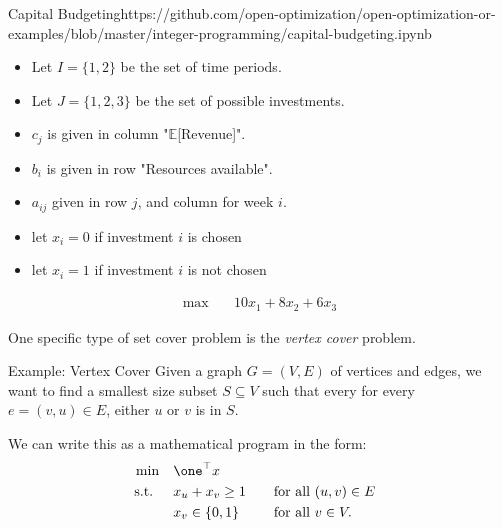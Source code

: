 %
\begin{examplewithcode}{Capital Budgeting}{https://github.com/open-optimization/open-optimization-or-examples/blob/master/integer-programming/capital-budgeting.ipynb}
\begin{itemize}
\item Let $I = \{1,2\}$ be the set of time periods.
\item Let $J = \{1, 2,3\}$ be the set of possible investments.
\end{itemize}
%
\begin{itemize}
\item $c_j$ is given in column "$\mathbb{E}$[Revenue]".
\item $b_i$ is given in row "Resources available".
\item $a_{ij}$ given in row $j$, and column for week $i$.
\end{itemize}
%
\begin{itemize}
\item let $x_i = 0$ if investment $i$ is chosen
\item let $x_i = 1$ if investment $i$ is not chosen
\end{itemize}
%
\begin{align*}
\max \quad & 10x_1+8x_2+6x_3   \tag{Total Expected Revenue}
\end{align*}
%
\end{examplewithcode}
%

One specific type of set cover problem is the \emph{vertex cover} problem.
\begin{general}{Example: Vertex Cover}{\npcomplete}
\label{ex:vertex-cover}
Given a graph $G = (V,E)$ of vertices and edges, we want to find a smallest size subset $S \subseteq V$ such that every for every $e = (v,u) \in E$, either $u$ or $v$ is in $S$.   

We can write this as a mathematical program in the form:
\begin{align*}
\min \quad & \one^\top x\\
\st \quad  & x_u + x_v \geq 1 &&\quad \text{for all } (u,v) \in E \\ 
& x_v \in \{0,1\} &&\quad \text{for all } v \in V.
\end{align*}
\end{general}

